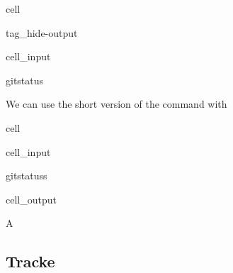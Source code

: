 \documentclass[a4paper,10pt,english]{jupyterBook}
\begin{document}
\begin{sphinxuseclass}{cell}
\begin{sphinxuseclass}{tag_hide-output}\begin{sphinxVerbatimInput}

\begin{sphinxuseclass}{cell_input}
\begin{sphinxVerbatim}[commandchars=\\\{\}]
gitstatus
\end{sphinxVerbatim}

\end{sphinxuseclass}\end{sphinxVerbatimInput}

\end{sphinxuseclass}
\end{sphinxuseclass}
\sphinxAtStartPar
We can use the short version of the command with 

\begin{sphinxuseclass}{cell}\begin{sphinxVerbatimInput}

\begin{sphinxuseclass}{cell_input}
\begin{sphinxVerbatim}[commandchars=\\\{\}]
gitstatus\PYGZhy{}s
\end{sphinxVerbatim}

\end{sphinxuseclass}\end{sphinxVerbatimInput}
\begin{sphinxVerbatimOutput}

\begin{sphinxuseclass}{cell_output}
\begin{sphinxVerbatim}[commandchars=\\\{\}]
  A
\end{sphinxVerbatim}

\end{sphinxuseclass}\end{sphinxVerbatimOutput}

\end{sphinxuseclass}

\subsection{Tracke}
\label{\detokenize{text/progtut/gitbasic:tracke}}
\end{document}

